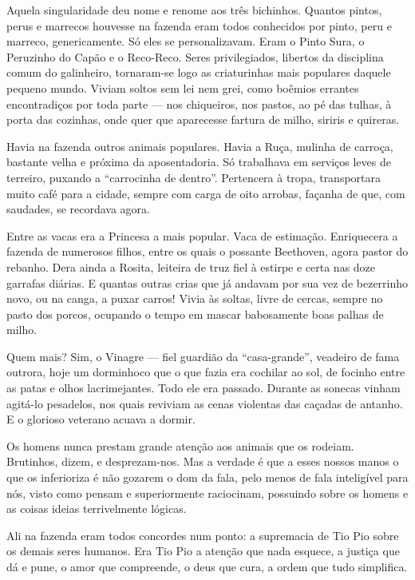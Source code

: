 Aquela singularidade deu nome e renome aos três bichinhos. Quantos
pintos, perus e marrecos houvesse na fazenda eram todos conhecidos por
pinto, peru e marreco, genericamente. Só eles se personalizavam. Eram o
Pinto Sura, o Peruzinho do Capão e o Reco-Reco. Seres privilegiados,
libertos da disciplina comum do galinheiro, tornaram-se logo as
criaturinhas mais populares daquele pequeno mundo. Viviam soltos sem lei
nem grei, como boêmios errantes encontradiços por toda parte --- nos
chiqueiros, nos pastos, ao pé das tulhas, à porta das cozinhas, onde
quer que aparecesse fartura de milho, siriris e quireras.

Havia na fazenda outros animais populares. Havia a Ruça, mulinha de
carroça, bastante velha e próxima da aposentadoria. Só trabalhava em
serviços leves de terreiro, puxando a ``carrocinha de dentro''.
Pertencera à tropa, transportara muito café para a cidade, sempre com
carga de oito arrobas, façanha de que, com saudades, se recordava agora.

Entre as vacas era a Princesa a mais popular. Vaca de estimação.
Enriquecera a fazenda de numerosos filhos, entre os quais o possante
Beethoven, agora pastor do rebanho. Dera ainda a Rosita, leiteira de
truz fiel à estirpe e certa nas doze garrafas diárias. E quantas outras
crias que já andavam por sua vez de bezerrinho novo, ou na canga, a
puxar carros! Vivia às soltas, livre de cercas, sempre no pasto dos
porcos, ocupando o tempo em mascar babosamente boas palhas de milho.

Quem mais? Sim, o Vinagre --- fiel guardião da ``casa-grande'', veadeiro
de fama outrora, hoje um dorminhoco que o que fazia era cochilar ao sol,
de focinho entre as patas e olhos lacrimejantes. Todo ele era passado.
Durante as sonecas vinham agitá-lo pesadelos, nos quais reviviam as
cenas violentas das caçadas de antanho. E o glorioso veterano acuava a
dormir.

Os homens nunca prestam grande atenção aos animais que os rodeiam.
Brutinhos, dizem, e desprezam-nos. Mas a verdade é que a esses nossos
manos o que os inferioriza é não gozarem o dom da fala, pelo menos de
fala inteligível para nós, visto como pensam e superiormente raciocinam,
possuindo sobre os homens e as coisas ideias terrivelmente lógicas.

Ali na fazenda eram todos concordes num ponto: a supremacia de Tio Pio
sobre os demais seres humanos. Era Tio Pio a atenção que nada esquece, a
justiça que dá e pune, o amor que compreende, o deus que cura, a ordem
que tudo simplifica.

